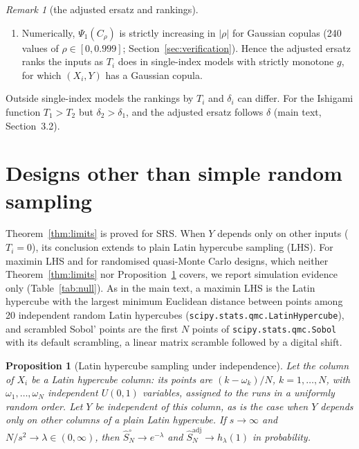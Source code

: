 \documentclass[11pt,a4paper]{article}
\newtheorem{proposition}[theorem]{Proposition}
\theoremstyle{definition}
\theoremstyle{remark}
\newtheorem{remark}[theorem]{Remark}
\newcommand{\Sadj}{\hat S^{\mathrm{adj}}_N}
\newcommand{\Sun}{\hat S^{\circ}_N}
\begin{document}
\begin{remark}[the adjusted ersatz and rankings]
\begin{enumerate}[label=(\alph*)]
\item Numerically, $\Psi_1(C_\rho)$ is strictly increasing in $|\rho|$ for Gaussian copulas (240 values of $\rho\in[0,0.999]$; Section~\ref{sec:verification}). Hence the adjusted ersatz ranks the inputs as $T_i$ does in single-index models with strictly monotone $g$, for which $(X_i,Y)$ has a Gaussian copula.
\end{enumerate}
Outside single-index models the rankings by $T_i$ and $\delta_i$ can differ. For the Ishigami function $T_1>T_2$ but $\delta_2>\delta_1$, and the adjusted ersatz follows $\delta$ (main text, Section~3.2).
\end{remark}

\section{Designs other than simple random sampling}\label{sec:designs}

Theorem~\ref{thm:limits} is proved for SRS. When $Y$ depends only on other inputs ($T_i=0$), its conclusion extends to plain Latin hypercube sampling (LHS). For maximin LHS and for randomised quasi-Monte Carlo designs, which neither Theorem~\ref{thm:limits} nor Proposition~\ref{prop:lhs} covers, we report simulation evidence only (Table~\ref{tab:null}). As in the main text, a maximin LHS is the Latin hypercube with the largest minimum Euclidean distance between points among 20 independent random Latin hypercubes (\texttt{scipy.stats.qmc.LatinHypercube}), and scrambled Sobol' points are the first $N$ points of \texttt{scipy.stats.qmc.Sobol} with its default scrambling, a linear matrix scramble followed by a digital shift.

\begin{proposition}[Latin hypercube sampling under independence]\label{prop:lhs}
Let the column of $X_i$ be a Latin hypercube column: its points are $(k-\omega_k)/N$, $k=1,\dots,N$, with $\omega_1,\dots,\omega_N$ independent $U(0,1)$ variables, assigned to the runs in a uniformly random order. Let $Y$ be independent of this column, as is the case when $Y$ depends only on other columns of a plain Latin hypercube. If $s\to\infty$ and $N/s^2\to\lambda\in(0,\infty)$, then $\Sun\to e^{-\lambda}$ and $\Sadj\to h_\lambda(1)$ in probability.
\end{proposition}
\end{document}
